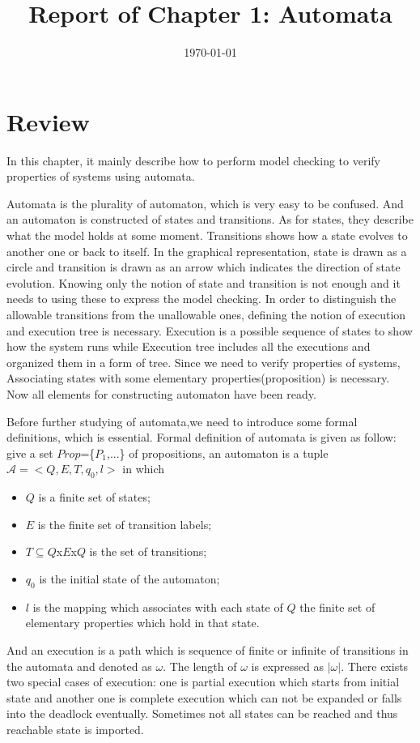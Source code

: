 \documentclass[11pt, conference]{IEEEtran}
\begin{document}
    \title{Report of Chapter 1: Automata}
    \author{}
    \date{\today}
    \maketitle

    \section{Review}
    In this chapter, it mainly describe how to perform model checking to verify properties of systems using automata.

    Automata is the plurality of automaton, which is very easy to be confused. And an automaton is constructed of states and transitions. As for states, they describe what the model holds at some moment. Transitions shows how a state evolves to another one or back to itself. In the graphical representation, state is drawn as a circle and transition is drawn as an arrow which indicates the direction of state evolution. Knowing only the notion of state and transition is not enough and it needs to using these to express the model checking. In order to distinguish the allowable transitions from the unallowable ones, defining the notion of execution and execution tree is necessary. Execution is a possible sequence of states to show how the system runs while Execution tree includes all the executions and organized them in a form of tree. Since we need to verify properties of systems, Associating states with some elementary properties(proposition) is necessary. Now all elements for constructing automaton have been ready.

    Before further studying of automata,we need to introduce some formal definitions, which is essential. Formal definition of automata is given as follow: give a set $Prop$=\{$P_1$,...\} of propositions, an automaton is a tuple $\mathcal{A}=<Q, E, T, q_0, l>$ in which
    \begin{itemize}
      \item $Q$ is a finite set of states;
      \item $E$ is the finite set of transition labels;
      \item $T\subseteq Q$x$E$x$Q$ is the set of transitions;
      \item $q_0$ is the initial state of the automaton;
      \item $l$ is the mapping which associates with each state of $Q$ the finite set of elementary properties which hold in that state.
    \end{itemize}
    And an execution is a path which is sequence of finite or infinite of transitions in the automata and denoted as $\omega$. The length of $\omega$ is expressed as $|\omega|$. There exists two special cases of execution: one is partial execution which starts from initial state and another one is complete execution which can not be expanded or falls into the deadlock eventually. Sometimes not all states can be reached and thus reachable state is imported.
\end{document}
